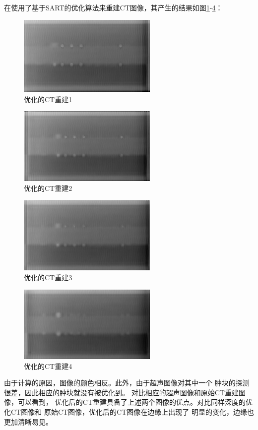 在使用了基于SART的优化算法来重建CT图像，其产生的结果如图\ref{fig:final1}-\ref{fig:final4}：
\begin{figure}[!ht]\label{fig:final1}
\center
\includegraphics[width=0.6\textwidth]{figure/result/final1.jpg}
\caption{优化的CT重建1}
\end{figure}
\begin{figure}[!ht]\label{fig:final2}
\center
\includegraphics[width=0.6\textwidth]{figure/result/final2.jpg}
\caption{优化的CT重建2}
\end{figure}
\begin{figure}[!ht]\label{fig:final3}
\center
\includegraphics[width=0.6\textwidth]{figure/result/final3.jpg}
\caption{优化的CT重建3}
\end{figure}
\begin{figure}[!ht]\label{fig:final4}
\center
\includegraphics[width=0.6\textwidth]{figure/result/final4.jpg}
\caption{优化的CT重建4}
\end{figure}
由于计算的原因，图像的颜色相反。此外，由于超声图像对其中一个
肿块的探测很差，因此相应的肿块就没有被优化到。
对比相应的超声图像和原始CT重建图像，可以看到，
优化后的CT重建具备了上述两个图像的优点。对比同样深度的优化CT图像和
原始CT图像，优化后的CT图像在边缘上出现了
明显的变化，边缘也更加清晰易见。

